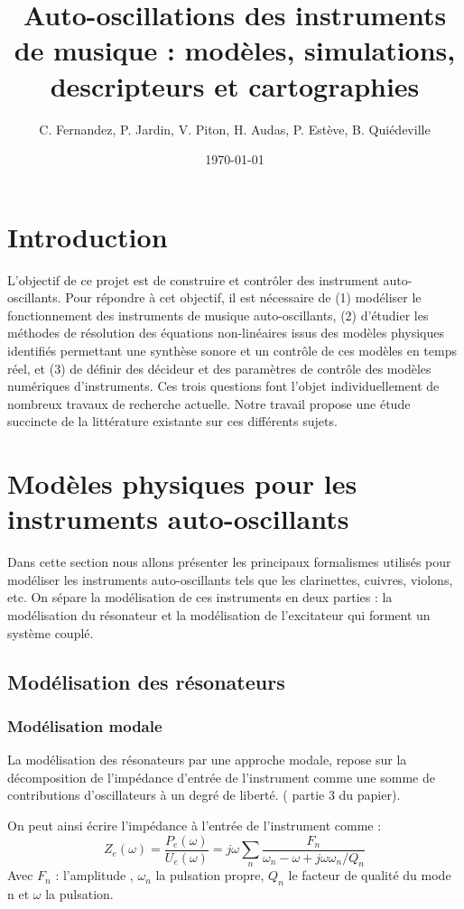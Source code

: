 \documentclass[atiam, article]{rapport} %
\title{Auto-oscillations des instruments de musique : modèles, simulations, descripteurs et cartographies}
\author{C. Fernandez, P. Jardin, V. Piton, H. Audas, P. Estève, B. Quiédeville} %
\date{\today}
\begin{document}
\maketitle

\tocpage

\section*{Introduction}
L'objectif de ce projet est de construire et contrôler des instrument auto-oscillants. Pour répondre à cet objectif, il est nécessaire de (1) modéliser le fonctionnement des instruments de musique auto-oscillants, (2) d'étudier les méthodes de résolution des équations non-linéaires issus des modèles physiques identifiés permettant une synthèse sonore et un contrôle de ces modèles en temps réel, et (3) de définir des décideur et des paramètres de contrôle des modèles numériques d'instruments. Ces trois questions font l'objet individuellement de nombreux travaux de recherche actuelle. Notre travail propose une étude succincte de la littérature existante sur ces différents sujets. 


\section{Modèles physiques pour les instruments auto-oscillants}\label{sec:models physiques}
Dans cette section nous allons présenter les principaux formalismes utilisés pour modéliser les instruments auto-oscillants tels que les clarinettes, cuivres, violons, etc. 
On sépare la modélisation de ces instruments en deux parties : la modélisation du résonateur et la modélisation de l'excitateur qui forment un système couplé. 

\subsection{Modélisation des résonateurs}
\subsubsection{Modélisation modale}
La modélisation des résonateurs par une approche modale, repose sur la décomposition de l'impédance d'entrée de l'instrument comme une somme de contributions d'oscillateurs à un degré de liberté. (\cite{missoum_explicit_2014} partie 3 du papier). 

On peut ainsi écrire l'impédance à l'entrée de l'instrument comme : 
\begin{equation}
    Z_e(\omega) = \frac{P_e(\omega)}{U_e(\omega)} = j\omega\sum_{n}\frac{F_n}{\omega_n-\omega+j\omega\omega_n/Q_n}
\end{equation}
Avec $F_n$ : l'amplitude , $\omega_n$ la pulsation propre, $Q_n$ le facteur de qualité du mode n et $\omega$ la pulsation. 
\end{document}
